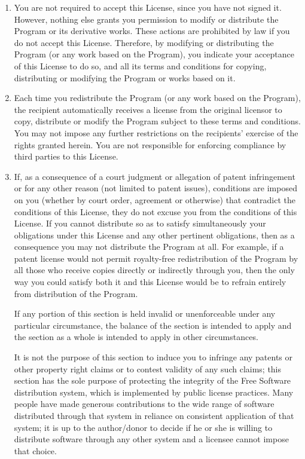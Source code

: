 \documentclass[11pt, letterpaper]{book}
\begin{document}
\begin{enumerate}
\item
You are not required to accept this License, since you have not
signed it. However, nothing else grants you permission to modify or
distribute the Program or its derivative works. These actions are
prohibited by law if you do not accept this License. Therefore, by
modifying or distributing the Program (or any work based on the
Program), you indicate your acceptance of this License to do so, and
all its terms and conditions for copying, distributing or modifying
the Program or works based on it.

\item
Each time you redistribute the Program (or any work based on the
Program), the recipient automatically receives a license from the
original licensor to copy, distribute or modify the Program subject to
these terms and conditions. You may not impose any further
restrictions on the recipients' exercise of the rights granted herein.
You are not responsible for enforcing compliance by third parties to
this License.

\item
If, as a consequence of a court judgment or allegation of patent
infringement or for any other reason (not limited to patent issues),
conditions are imposed on you (whether by court order, agreement or
otherwise) that contradict the conditions of this License, they do not
excuse you from the conditions of this License. If you cannot
distribute so as to satisfy simultaneously your obligations under this
License and any other pertinent obligations, then as a consequence you
may not distribute the Program at all. For example, if a patent
license would not permit royalty-free redistribution of the Program by
all those who receive copies directly or indirectly through you, then
the only way you could satisfy both it and this License would be to
refrain entirely from distribution of the Program.

If any portion of this section is held invalid or unenforceable under
any particular circumstance, the balance of the section is intended to
apply and the section as a whole is intended to apply in other
circumstances.

It is not the purpose of this section to induce you to infringe any
patents or other property right claims or to contest validity of any
such claims; this section has the sole purpose of protecting the
integrity of the Free Software distribution system, which is
implemented by public license practices. Many people have made
generous contributions to the wide range of software distributed
through that system in reliance on consistent application of that
system; it is up to the author/donor to decide if he or she is willing
to distribute software through any other system and a licensee cannot
impose that choice.


\end{enumerate}
\end{document}
